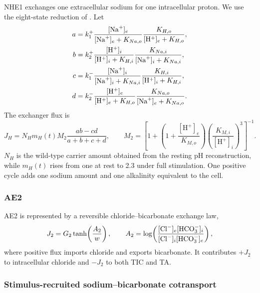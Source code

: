 NHE1 exchanges one extracellular sodium for one intracellular proton. We use the eight-state reduction of \citet{Cha2009}. Let
\begin{align*}
 a&=k_1^+\frac{[\mathrm{Na}^{+}]_e}{[\mathrm{Na}^{+}]_e+K_{Na,o}}
       \frac{K_{H,o}}{[\mathrm H^+]_e+K_{H,o}},\\
 b&=k_2^+\frac{[\mathrm H^+]_i}{[\mathrm H^+]_i+K_{H,i}}
       \frac{K_{Na,i}}{[\mathrm{Na}^{+}]_i+K_{Na,i}},\\
 c&=k_1^-\frac{[\mathrm{Na}^{+}]_i}{[\mathrm{Na}^{+}]_i+K_{Na,i}}
       \frac{K_{H,i}}{[\mathrm H^+]_i+K_{H,i}},\\
 d&=k_2^-\frac{[\mathrm H^+]_e}{[\mathrm H^+]_e+K_{H,o}}
       \frac{K_{Na,o}}{[\mathrm{Na}^{+}]_e+K_{Na,o}}.
\end{align*}
The exchanger flux is
\begin{equation}
    J_H=N_H m_H(t) M_2\frac{ab-cd}{a+b+c+d},
    \qquad
    M_2=\left[1+\left(1+\frac{[\mathrm H^+]_e}{K_{M,o}}\right)
    \left(\frac{K_{M,i}}{[\mathrm H^+]_i}\right)^3\right]^{-1}.
    \label{eq:nhe1}
\end{equation}
$N_H$ is the wild-type carrier amount obtained from the resting pH reconstruction, while $m_H(t)$ rises from one at rest to 2.3 under full stimulation. One positive cycle adds one sodium amount and one alkalinity equivalent to the cell.

\subsubsection{AE2}

AE2 is represented by a reversible chloride--bicarbonate exchange law,
\begin{equation*}
    J_2=G_2\tanh\!\left(\frac{A_2}{w}\right),
    \qquad
    A_2=\log\!\left(\frac{[\mathrm{Cl}^{-}]_e[\mathrm{HCO}_{3}^{-}]_i}{[\mathrm{Cl}^{-}]_i[\mathrm{HCO}_{3}^{-}]_e}\right),
\end{equation*}
where positive flux imports chloride and exports bicarbonate. It contributes $+J_2$ to intracellular chloride and $-J_2$ to both TIC and TA.

\subsubsection{Stimulus-recruited sodium--bicarbonate cotransport}
\label{sec:nbc}

